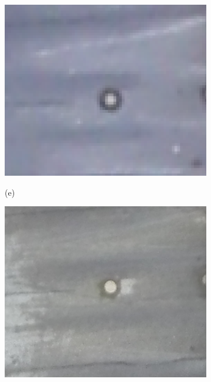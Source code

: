 \begin{figure}[tbp]
       \begin{subfigure}[tbp]{0.241\columnwidth}
           \centering
           \includegraphics[width=\textwidth]{figures_5/germering_manhole_aerial.png}
           {{\small }}    
           \centerline{\small{(e)}}\medskip
       \end{subfigure}
        \hfill
       \begin{subfigure}[tbp]{0.241\columnwidth}
           \centering
           \includegraphics[width=\textwidth]{figures_5/germering_manhole_uav.png}

\end{subfigure}
\end{figure}
